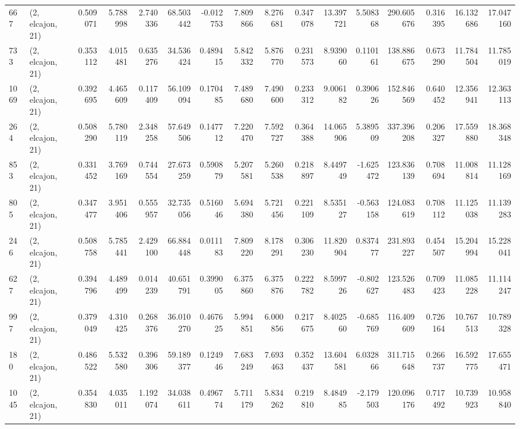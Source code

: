 \begin{tabular}{llrrrrrrrrrrrrrr}
667  &  (2, elcajon, 21) &   0.509071 &   5.788998 &   2.740336 &     68.503442 &   -0.012753 &    7.809866 &    8.276681 &  0.347078 &  13.397721 &   5.508368 &   290.605676 &   0.316395 &  16.132686 &  17.047160 \\
733  &  (2, elcajon, 21) &   0.353112 &   4.015481 &   0.635276 &     34.536424 &    0.489415 &    5.842332 &    5.876770 &  0.231573 &   8.939060 &   0.110161 &   138.886675 &   0.673290 &  11.784504 &  11.785019 \\
1069 &  (2, elcajon, 21) &   0.392695 &   4.465609 &   0.117409 &     56.109094 &    0.170485 &    7.489680 &    7.490600 &  0.233312 &   9.006182 &   0.390626 &   152.846569 &   0.640452 &  12.356941 &  12.363113 \\
264  &  (2, elcajon, 21) &   0.508290 &   5.780119 &   2.348258 &     57.649506 &    0.147712 &    7.220470 &    7.592727 &  0.364388 &  14.065906 &   5.389509 &   337.396208 &   0.206327 &  17.559880 &  18.368348 \\
853  &  (2, elcajon, 21) &   0.331452 &   3.769169 &   0.744554 &     27.673259 &    0.590879 &    5.207581 &    5.260538 &  0.218897 &   8.449749 &  -1.625472 &   123.836139 &   0.708694 &  11.008814 &  11.128169 \\
805  &  (2, elcajon, 21) &   0.347477 &   3.951406 &   0.555957 &     32.735056 &    0.516046 &    5.694380 &    5.721456 &  0.221109 &   8.535127 &  -0.563158 &   124.083619 &   0.708112 &  11.125038 &  11.139283 \\
246  &  (2, elcajon, 21) &   0.508758 &   5.785441 &   2.429100 &     66.884448 &    0.011183 &    7.809220 &    8.178291 &  0.306230 &  11.820904 &   0.837477 &   231.893227 &   0.454507 &  15.204994 &  15.228041 \\
627  &  (2, elcajon, 21) &   0.394796 &   4.489499 &   0.014239 &     40.651791 &    0.399005 &    6.375860 &    6.375876 &  0.222782 &   8.599726 &  -0.802627 &   123.526483 &   0.709423 &  11.085228 &  11.114247 \\
997  &  (2, elcajon, 21) &   0.379049 &   4.310425 &   0.268376 &     36.010270 &    0.467625 &    5.994851 &    6.000856 &  0.217675 &   8.402560 &  -0.685769 &   116.409609 &   0.726164 &  10.767513 &  10.789328 \\
180  &  (2, elcajon, 21) &   0.486522 &   5.532580 &   0.396306 &     59.189377 &    0.124946 &    7.683249 &    7.693463 &  0.352437 &  13.604581 &   6.032866 &   311.715648 &   0.266737 &  16.592775 &  17.655471 \\
1045 &  (2, elcajon, 21) &   0.354830 &   4.035011 &   1.192074 &     34.038611 &    0.496774 &    5.711179 &    5.834262 &  0.219810 &   8.484985 &  -2.179503 &   120.096176 &   0.717492 &  10.739923 &  10.958840 \\

\end{tabular}
